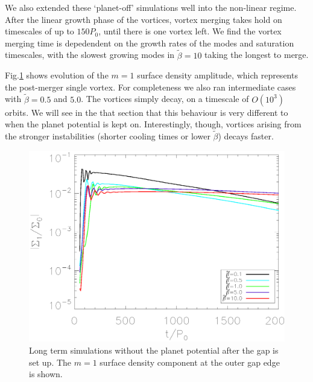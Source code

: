 We also extended these `planet-off' simulations well into the non-linear
regime. After the linear growth phase of the vortices, vortex merging
takes hold on timescales of up to $150P_0$, until there is one vortex
left. We find the vortex merging
time is depedendent on the growth rates of the modes and saturation
timescales, with the slowest growing modes in $\tilde\beta=10$ taking
the longest to merge.  

Fig.\ref{planetofflifetimeplot} shows evolution of the $m=1$ surface
density amplitude, which represents the post-merger single vortex. For
completeness we also ran intermediate cases with $\tilde{\beta}=0.5$
and $5.0$. The vortices simply decay, on a timescale of $O(10^3)$
orbits. We will see in the that section that this behaviour is very
different to when the planet potential is kept on. Interestingly,
though, vortices arising from the stronger instabilities (shorter
cooling times or lower $\tilde{\beta}$) decays faster.  




\begin{figure}
  \includegraphics[width=\linewidth,clip=true,trim=0.5cm
  0cm 0cm 1.1cm]{figures/longterm_planetoff}
  \caption{Long term simulations without the planet potential after
    the gap is set up. The $m=1$ surface density component at the
    outer gap edge is shown.
  } \label{planetofflifetimeplot}
\end{figure}


